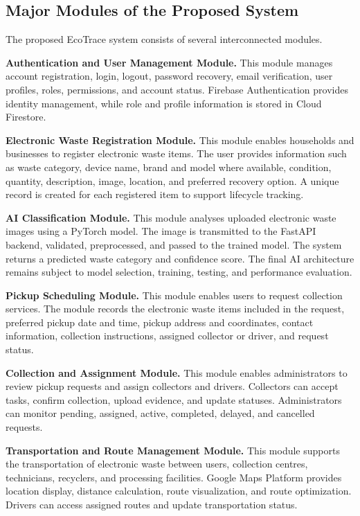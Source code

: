 \subsection{Major Modules of the Proposed System}
The proposed EcoTrace system consists of several interconnected modules.

\textbf{Authentication and User Management Module.} This module manages
account registration, login, logout, password recovery, email verification, user
profiles, roles, permissions, and account status. Firebase Authentication provides
identity management, while role and profile information is stored in Cloud
Firestore.

\textbf{Electronic Waste Registration Module.} This module enables households
and businesses to register electronic waste items. The user provides information
such as waste category, device name, brand and model where available,
condition, quantity, description, image, location, and preferred recovery option.
A unique record is created for each registered item to support lifecycle tracking.

\textbf{AI Classification Module.} This module analyses uploaded electronic
waste images using a PyTorch model. The image is transmitted to the FastAPI
backend, validated, preprocessed, and passed to the trained model. The system returns a
predicted waste category and confidence score. The final AI architecture remains
subject to model selection, training, testing, and performance evaluation.

\textbf{Pickup Scheduling Module.} This module enables users to request
collection services. The module records the electronic waste items included in
the request, preferred pickup date and time, pickup address and coordinates,
contact information, collection instructions, assigned collector or driver, and
request status.

\textbf{Collection and Assignment Module.} This module enables administrators
to review pickup requests and assign collectors and drivers. Collectors can accept
tasks, confirm collection, upload evidence, and update statuses. Administrators
can monitor pending, assigned, active, completed, delayed, and cancelled
requests.

\textbf{Transportation and Route Management Module.} This module supports
the transportation of electronic waste between users, collection centres,
technicians, recyclers, and processing facilities. Google Maps Platform provides
location display, distance calculation, route visualization, and route optimization.
Drivers can access assigned routes and update transportation status.

